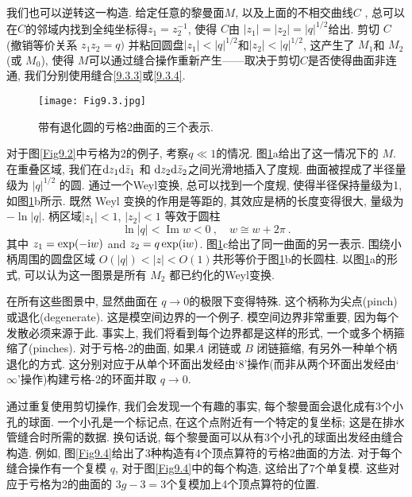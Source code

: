 我们也可以逆转这一构造. 给定任意的黎曼面$M$, 以及上面的不相交曲线$C$ , 总可以在$C$的邻域内找到全纯坐标得$z_{1}=z_{2}^{-1}$, 
使得 $C$由 $|z_{1}| = |z_{2}| = |q|^{1/2}$给出. 剪切 $C$ (撤销等价关系 $z_{1} z_{2}=q)$ 并粘回圆盘$|z_{1}|<|q|^{1/2}$和$|z_{2}|<|q|^{1/2}$, 
这产生了 $M_{1}$和 $M_{2}$(或 $M_{0}$), 使得 $M$可以通过缝合操作重新产生——取决于剪切$C$是否使得曲面非连通, 我们分别使用缝合\eqref{9.3.3}或\eqref{9.3.4}.


\begin{figure}[h]
	\begin{center}
		\texttt{[image: Fig9.3.jpg]}\\
		\caption{带有退化圆的亏格2曲面的三个表示.}\label{Fig9.3}
	\end{center}
\end{figure}

对于图\ref{Fig9.2}中亏格为2的例子, 考察$q \ll 1$的情况. 图\ref{Fig9.3}a给出了这一情况下的 $M$. 
在重叠区域, 我们在$\mathrm{d} z_{1} \mathrm{d} \bar{z}_{1}$ 和 $\mathrm{d} z_{2} \mathrm{d} \bar{z}_{2}$之间光滑地插入了度规. 
曲面被捏成了半径量级为 $|q|^{1/2} $ 的圆. 通过一个Weyl变换, 总可以找到一个度规, 使得半径保持量级为1, 如图\ref{Fig9.3}b所示. 
既然 Weyl 变换的作用是等距的, 其效应是柄的长度变得很大, 量级为$-\ln |q|$. 柄区域$|z_{1}|<1$, $|z_{2}|<1$ 等效于圆柱
\begin{equation}
	\ln |q|<\operatorname{Im} w<0 \:, \quad w \cong w+2 \pi \:. \label{9.3.5}
\end{equation}
其中 $z_{1}=\exp (-\mathrm{i} w)$ and $z_{2}=q \exp (\mathrm{i} w) $. 图\ref{Fig9.3}c给出了同一曲面的另一表示. 
围绕小柄周围的圆盘区域 $O(|q|)<|z|<O(1)$共形等价于图\ref{Fig9.3}b的长圆柱. 
以图\ref{Fig9.3}a的形式, 可以认为这一图景是所有 $M_{2}$ 都已约化的Weyl变换.

在所有这些图景中, 显然曲面在 $q \rightarrow 0$的极限下变得特殊. 这个柄称为尖点(pinch)或退化(degenerate). 这是模空间边界的一个例子. 
模空间边界非常重要, 因为每个发散必须来源于此. 事实上, 我们将看到每个边界都是这样的形式, 一个或多个柄箍缩了(pinches). 
对于亏格-2的曲面, 如果$A$ 闭链或 $B$ 闭链箍缩, 有另外一种单个柄退化的方式. 
这分别对应于从单个环面出发经由`8'操作(而非从两个环面出发经由`$\infty$'操作)构建亏格-2的环面并取 $q \rightarrow 0$.

通过重复使用剪切操作, 我们会发现一个有趣的事实, 每个黎曼面会退化成有3个小孔的球面. 一个小孔是一个标记点, 在这个点附近有一个特定的复坐标; 
这是在排水管缝合时所需的数据. 换句话说, 每个黎曼面可以从有3个小孔的球面出发经由缝合构造. 例如, 图\ref{Fig9.4}给出了3种构造有4个顶点算符的亏格2曲面的方法. 
对于每个缝合操作有一个复模 $q$, 对于图\ref{Fig9.4}中的每个构造, 这给出了7个单复模. 这些对应于亏格为2的曲面的 $3 g-3=3$个复模加上4个顶点算符的位置.

